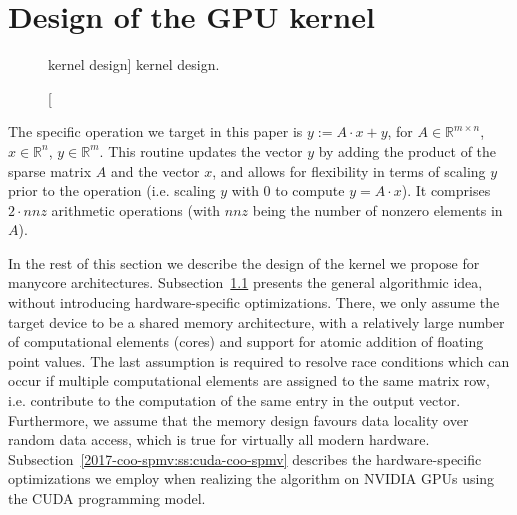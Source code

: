 \section{Design of the \coo \spmv GPU kernel}
\label{2017-coo-spmv:s3-kernel}

\begin{figure}[t]

\caption
[\coo \spmv kernel design]
{\coo \spmv kernel design.}
\label{2017-coo-spmv:fig:spmv}
\end{figure}

The specific \spmv operation we target in this paper is $y := A\cdot x + y$, 
for $A\in\mathbb{R}^{m\times n}$, $x\in\mathbb{R}^n$, $y\in\mathbb{R}^m$.
This routine updates the vector $y$
by adding the product of the sparse matrix $A$ and the vector $x$,
and allows for flexibility in terms of scaling $y$ prior to the
operation (i.e. scaling $y$ with 0 to compute $y=A\cdot x$).
It comprises $2\cdot nnz$ arithmetic operations (with $nnz$ being the number of nonzero elements in $A$).

In the rest of this section we describe the design of the \coo \spmv kernel we 
propose for manycore architectures.
Subsection~\ref{2017-coo-spmv:ss:coo-spmv} presents the general algorithmic idea, without
introducing hardware-specific optimizations.
There, we only assume the target device to be a shared memory 
architecture, with a relatively large number of
computational elements (cores) and support for atomic addition of floating
point values.
The last assumption is required to resolve race conditions which can occur if 
multiple computational elements are assigned to the same matrix row, i.e. 
contribute 
to the computation of the same entry in the output vector.
Furthermore, we assume that the memory design favours data locality over
random data access, which is true for virtually all modern hardware.
Subsection~\ref{2017-coo-spmv:ss:cuda-coo-spmv} describes the hardware-specific optimizations 
we employ when realizing the \coo \spmv algorithm on NVIDIA GPUs using 
the CUDA programming model.

\subsection{\coo \spmv}
\label{2017-coo-spmv:ss:coo-spmv}

